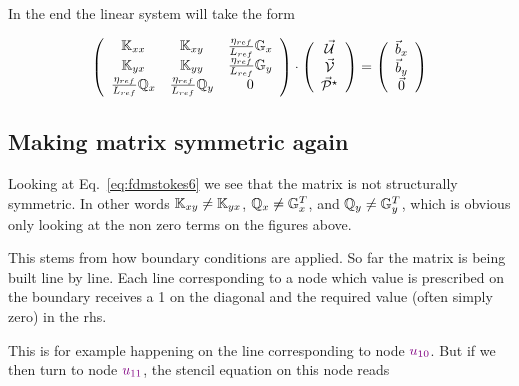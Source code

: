 In the end the linear system will take the form 

\begin{equation}
\left(
\begin{array}{ccc}
{\mathbb{K}}_{xx} & {\mathbb{K}}_{xy} & \frac{\eta_{ref}}{L_{ref}} {\mathbb{G}}_x \\
{\mathbb{K}}_{yx} & {\mathbb{K}}_{yy} & \frac{\eta_{ref}}{L_{ref}} {\mathbb{G}}_y \\
\frac{\eta_{ref}}{L_{ref}} {\mathbb{Q}}_x & \frac{\eta_{ref}}{L_{ref}} {\mathbb{Q}}_y & 0
\end{array}
\right)
\cdot
\left(
\begin{array}{c}
\vec{\cal U} \\
\vec{\cal V} \\
\vec{\cal P}^\star
\end{array}
\right)
=
\left(
\begin{array}{c}
\vec{b}_x \\
\vec{b}_y \\
\vec{0}
\end{array}
\right)
\label{eq:fdmstokes7}
\end{equation}


















\subsection{Making matrix symmetric again}

Looking at Eq.~\eqref{eq:fdmstokes6} we see that the matrix is 
not structurally symmetric. In other words ${\mathbb{K}}_{xy} \neq {\mathbb{K}}_{yx}$, 
${\mathbb{Q}}_x \neq {\mathbb{G}}_x^T$, and ${\mathbb{Q}}_y \neq {\mathbb{G}}_y^T$, which is obvious only 
looking at the non zero terms on the figures above. 

This stems from how boundary conditions are applied. So far the matrix 
is being built line by line.
Each line corresponding to a node which value is prescribed on the 
boundary receives a 1 on the diagonal and the required value 
(often simply zero) in the rhs.

This is for example happening on the line corresponding to node 
${\color{violet} u_{10}}$. 
But if we then turn to node ${\color{violet} u_{11}}$, the stencil 
equation on this node reads


